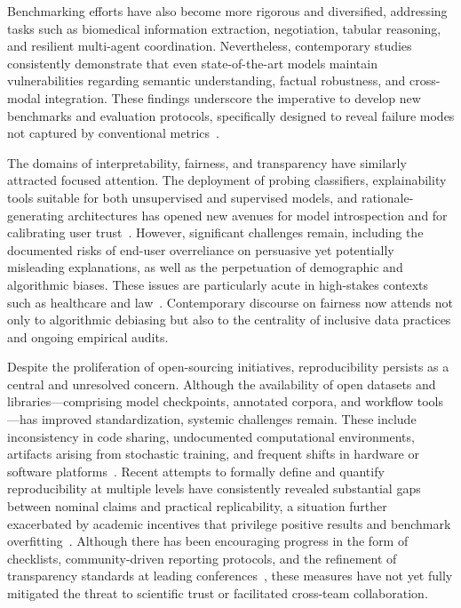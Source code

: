 Benchmarking efforts have also become more rigorous and diversified, addressing tasks such as biomedical information extraction, negotiation, tabular reasoning, and resilient multi-agent coordination. Nevertheless, contemporary studies consistently demonstrate that even state-of-the-art models maintain vulnerabilities regarding semantic understanding, factual robustness, and cross-modal integration. These findings underscore the imperative to develop new benchmarks and evaluation protocols, specifically designed to reveal failure modes not captured by conventional metrics~\cite{ref13,ref38,ref47,ref56,ref66,ref67,ref101}.

The domains of interpretability, fairness, and transparency have similarly attracted focused attention. The deployment of probing classifiers, explainability tools suitable for both unsupervised and supervised models, and rationale-generating architectures has opened new avenues for model introspection and for calibrating user trust~\cite{ref31,ref32,ref36,ref48,ref50,ref51,ref54,ref55}. However, significant challenges remain, including the documented risks of end-user overreliance on persuasive yet potentially misleading explanations, as well as the perpetuation of demographic and algorithmic biases. These issues are particularly acute in high-stakes contexts such as healthcare and law~\cite{ref31,ref33,ref36,ref39,ref45,ref53}. Contemporary discourse on fairness now attends not only to algorithmic debiasing but also to the centrality of inclusive data practices and ongoing empirical audits.

Despite the proliferation of open-sourcing initiatives, reproducibility persists as a central and unresolved concern. Although the availability of open datasets and libraries—comprising model checkpoints, annotated corpora, and workflow tools—has improved standardization, systemic challenges remain. These include inconsistency in code sharing, undocumented computational environments, artifacts arising from stochastic training, and frequent shifts in hardware or software platforms~\cite{ref74,ref75,ref80,ref81,ref83,ref85,ref86,ref87,ref91}. Recent attempts to formally define and quantify reproducibility at multiple levels have consistently revealed substantial gaps between nominal claims and practical replicability, a situation further exacerbated by academic incentives that privilege positive results and benchmark overfitting~\cite{ref79,ref82,ref85,ref87,ref91}. Although there has been encouraging progress in the form of checklists, community-driven reporting protocols, and the refinement of transparency standards at leading conferences~\cite{ref81,ref83,ref84}, these measures have not yet fully mitigated the threat to scientific trust or facilitated cross-team collaboration.

